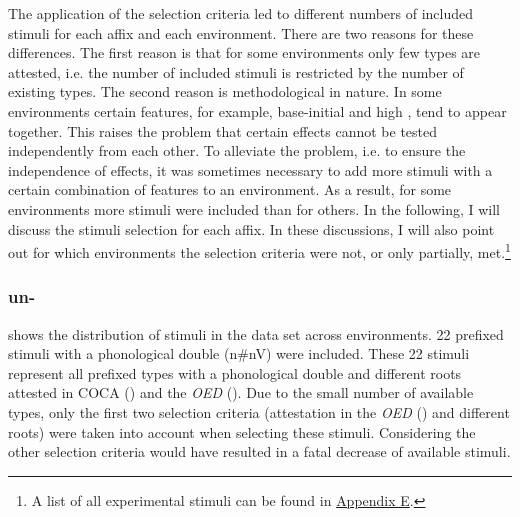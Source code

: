  

The application of the selection criteria led to different numbers of included stimuli for each affix and each environment. 
There are two reasons for these differences. The first reason is that for some environments only few types are attested, i.e. the number of included stimuli is restricted by the number of existing types. The second reason is methodological in nature. 
In some environments 
certain features, for example, base-initial  and high , tend to appear together. This raises the problem that certain effects cannot be tested independently from each other. To alleviate the problem, i.e. to ensure the independence of effects, it was sometimes necessary to add more stimuli with a certain combination of features to an environment. As a result, for some environments more stimuli were included than for others. 
In the following, I will discuss the stimuli selection for each affix. In these discussions, I will also point out for which environments the selection criteria were not, or only partially, met.\footnote{A list of all experimental stimuli can be found in \hyperref[Appendix E: Stimuli of Experimental Study]{Appendix E}.} 


\subsubsection{un-}

 shows the distribution of  stimuli in the data set across environments. 
22  prefixed stimuli with a phonological double ({n\#nV}) were included. These 22 stimuli represent all prefixed types with a phonological double and different roots attested in  {COCA} (\citealt{Davies.20082014}) and the \textit{OED} (\citealt{OED.2013}). 
Due to the small number of available types, only the first two selection criteria (attestation in the \textit{OED} (\citealt{OED.2013}) and different roots) were taken into account when selecting these stimuli. Considering the other selection criteria would have resulted in a fatal decrease of available stimuli. 



